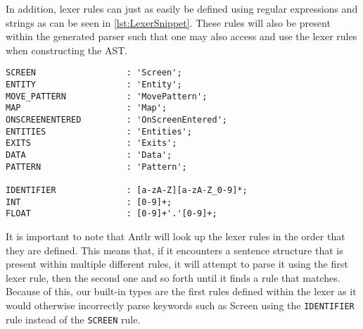 In addition, lexer rules can just as easily be defined using regular expressions and strings as can be seen in \ref{lst:LexerSnippet}.
These rules will also be present within the generated parser such that one may also access and use the lexer rules when constructing the AST. 

\begin{lstlisting}[caption={A snippet of few lexer rules for \dazel{}.}, label={lst:LexerSnippet},escapechar=|]
SCREEN                  : 'Screen';
ENTITY                  : 'Entity';
MOVE_PATTERN            : 'MovePattern';
MAP                     : 'Map';
ONSCREENENTERED         : 'OnScreenEntered';
ENTITIES                : 'Entities';
EXITS                   : 'Exits';
DATA                    : 'Data';
PATTERN                 : 'Pattern';

IDENTIFIER              : [a-zA-Z][a-zA-Z_0-9]*;
INT                     : [0-9]+;
FLOAT                   : [0-9]+'.'[0-9]+;	
\end{lstlisting}

It is important to note that Antlr will look up the lexer rules in the order that they are defined. 
This means that, if it encounters a sentence structure that is present within multiple different rules, it will attempt to parse it using the first lexer rule, then the second one and so forth until it finds a rule that matches. 
Because of this, our built-in types are the first rules defined within the lexer as it would otherwise incorrectly parse keywords such as Screen using the \texttt{IDENTIFIER} rule instead of the \texttt{SCREEN} rule\cite{parrDefinitiveANTLRReference2012}.
